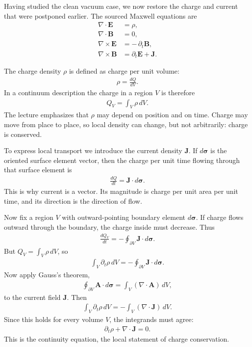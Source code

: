 Having studied the clean vacuum case, we now restore the charge and current that were postponed earlier. The sourced Maxwell equations are
\begin{align}
\nabla \cdot \mathbf E &= \rho,\\
\nabla \cdot \mathbf B &= 0,\\
\nabla \times \mathbf E &= -\,\partial_t \mathbf B,\\
\nabla \times \mathbf B &= \partial_t \mathbf E + \mathbf J.
\end{align}

The charge density \(\rho\) is defined as charge per unit volume:
\begin{align}
\rho = \frac{dQ}{dV}.
\end{align}
In a continuum description the charge in a region \(V\) is therefore
\begin{align}
Q_V = \int_V \rho\,dV.
\end{align}
The lecture emphasizes that \(\rho\) may depend on position and on time. Charge may move from place to place, so local density can change, but not arbitrarily: charge is conserved.

To express local transport we introduce the current density \(\mathbf J\). If \(d\boldsymbol{\sigma}\) is the oriented surface element vector, then the charge per unit time flowing through that surface element is
\begin{align}
\frac{dQ}{dt} = \mathbf J \cdot d\boldsymbol{\sigma}.
\end{align}
This is why current is a vector. Its magnitude is charge per unit area per unit time, and its direction is the direction of flow.

Now fix a region \(V\) with outward-pointing boundary element \(d\boldsymbol{\sigma}\). If charge flows outward through the boundary, the charge inside must decrease. Thus
\begin{align}
\frac{dQ_V}{dt} = -\oint_{\partial V} \mathbf J \cdot d\boldsymbol{\sigma}.
\end{align}
But \(Q_V=\int_V \rho\,dV\), so
\begin{align}
\int_V \partial_t \rho\,dV = -\oint_{\partial V} \mathbf J \cdot d\boldsymbol{\sigma}.
\end{align}
Now apply Gauss's theorem,
\begin{align}
\oint_{\partial V} \mathbf A \cdot d\boldsymbol{\sigma}
= \int_V (\nabla \cdot \mathbf A)\,dV,
\end{align}
to the current field \(\mathbf J\). Then
\begin{align}
\int_V \partial_t \rho\,dV
= -\int_V (\nabla \cdot \mathbf J)\,dV.
\end{align}
Since this holds for every volume \(V\), the integrands must agree:
\begin{align}
\partial_t \rho + \nabla \cdot \mathbf J = 0.
\end{align}
This is the continuity equation, the local statement of charge conservation.

